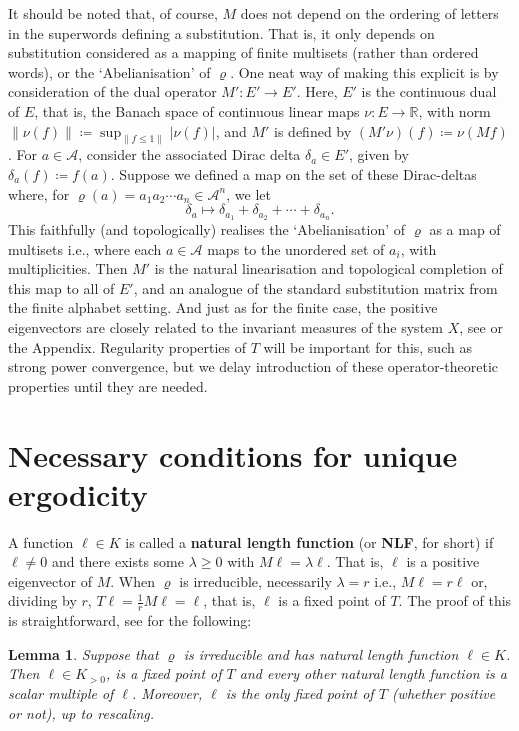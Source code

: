 \documentclass[11pt]{amsart}
\numberwithin{equation}{section}
\theoremstyle{plain}
\newtheorem{lemma}[theorem]{Lemma}
\theoremstyle{definition}
\newcommand{\R}{{\mathbb R}}
\newcommand{\mc}{\mathcal}
\newcommand{\A}{\mc A}
\newcommand{\sub}{\varrho}
\begin{document}
It should be noted that, of course, \(M\) does not depend on the ordering of letters in the superwords defining a substitution. That is, it only depends on substitution considered as a mapping of finite multisets (rather than ordered words), or the `Abelianisation' of \(\sub\). One neat way of making this explicit is by consideration of the dual operator \(M' \colon E' \to E'\). Here, \(E'\) is the continuous dual of \(E\), that is, the Banach space of continuous linear maps \(\nu \colon E \to \R\), with norm \(\|\nu(f)\| \coloneqq \sup_{\|f \leq 1\|} |\nu(f)|\), and \(M'\) is defined by \( (M'\nu)(f) \coloneqq \nu(M f)\). For \(a \in \A\), consider the associated Dirac delta \(\delta_a \in E'\), given by \(\delta_a(f) \coloneqq f(a)\). Suppose we defined a map on the set of these Dirac-deltas where, for \(\sub(a) = a_1 a_2 \cdots a_n \in \A^n\), we let
\[
\delta_a \mapsto \delta_{a_1} + \delta_{a_2} + \cdots + \delta_{a_n} .
\]
This faithfully (and topologically) realises the `Abelianisation' of \(\sub\) as a map of multisets i.e., where each \(a \in \A\) maps to the unordered set of \(a_i\), with multiplicities. Then \(M'\) is the natural linearisation and topological completion of this map to all of \(E'\), and an analogue of the standard substitution matrix from the finite alphabet setting. And just as for the finite case, the positive eigenvectors are closely related to the invariant measures of the system \(X\), see \cite[Section 5]{MRW25} or the Appendix. Regularity properties of \(T\) will be important for this, such as strong power convergence, but we delay introduction of these operator-theoretic properties until they are needed.

\section{Necessary conditions for unique ergodicity} \label{sec:necessary UE conditions}

A function \(\ell \in K\) is called a \textbf{natural length function} (or \textbf{NLF}, for short) if \(\ell \neq 0\) and there exists some \(\lambda \geq 0\) with \(M \ell = \lambda \ell\). That is, \(\ell\) is a positive eigenvector of \(M\). When \(\sub\) is irreducible, necessarily \(\lambda = r\) i.e., \(M \ell = r\ell\) or, dividing by \(r\), \(T \ell = \frac{1}{r} M \ell = \ell\), that is, \(\ell\) is a fixed point of \(T\). The proof of this is straightforward, see \cite[Theorem 4.26]{MRW25} for the following:

\begin{lemma}\label{lem:NLF unique and positive}
Suppose that \(\sub\) is irreducible and has natural length function \(\ell \in K\). Then \(\ell \in K_{>0}\), is a fixed point of \(T\) and every other natural length function is a scalar multiple of \(\ell\). Moreover, \(\ell\) is the only fixed point of \(T\) (whether positive or not), up to rescaling.
\end{lemma}
\end{document}
